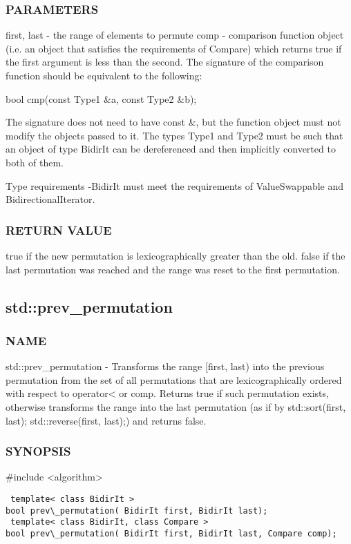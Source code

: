 \subsubsection{PARAMETERS}
first, last - the range of elements to permute
comp - comparison function object (i.e. an object that satisfies the requirements of Compare) which returns true if the first argument is less than the second.
The signature of the comparison function should be equivalent to the following:

 bool cmp(const Type1 \&a, const Type2 \&b);

The signature does not need to have const \&, but the function object must not modify the objects passed to it.
The types Type1 and Type2 must be such that an object of type BidirIt can be dereferenced and then implicitly converted to both of them.

 Type requirements
 -BidirIt must meet the requirements of ValueSwappable and BidirectionalIterator.

\subsubsection{RETURN VALUE}
true if the new permutation is lexicographically greater than the old. false if the last permutation was reached and the range was reset to the first permutation.



\subsection{std::prev\_permutation}

\subsubsection{NAME}
std::prev\_permutation - Transforms the range [first, last) into the previous permutation from the set of all permutations that are lexicographically ordered with respect to operator< or comp. Returns true if such permutation exists, otherwise transforms the range into the last permutation (as if by std::sort(first, last); std::reverse(first, last);) and returns false.

\subsubsection{SYNOPSIS}
\#include <algorithm>

\begin{lstlisting}
 template< class BidirIt >
bool prev\_permutation( BidirIt first, BidirIt last);
 template< class BidirIt, class Compare >
bool prev\_permutation( BidirIt first, BidirIt last, Compare comp);
\end{lstlisting}

